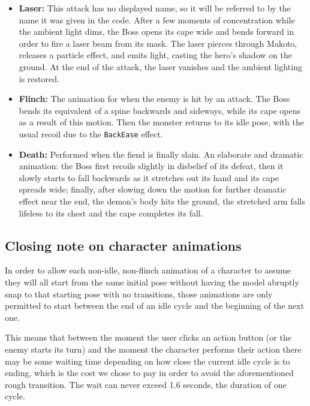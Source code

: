 \begin{itemize}
    \item \textbf{Laser:} This attack has no displayed name, so it will be referred to by the name it was given in the code. After a few moments of concentration while the ambient light dims, the Boss opens its cape wide and bends forward in order to fire a laser beam from its mask. The laser pierces through Makoto, releases a particle effect, and emits light, casting the hero's shadow on the ground. At the end of the attack, the laser vanishes and the ambient lighting is restored.
    
    \item \textbf{Flinch:} The animation for when the enemy is hit by an attack. The Boss bends its equivalent of a spine backwards and sideways, while its cape opens as a result of this motion. Then the monster returns to its idle pose, with the usual recoil due to the \texttt{BackEase} effect.
    
    \item \textbf{Death:} Performed when the fiend is finally slain. An elaborate and dramatic animation: the Boss first recoils slightly in disbelief of its defeat, then it slowly starts to fall backwards as it stretches out its hand and its cape spreads wide; finally, after slowing down the motion for further dramatic effect near the end, the demon's body hits the ground, the stretched arm falls lifeless to its chest and the cape completes its fall.
\end{itemize}


\subsection{Closing note on character animations}

In order to allow each non-idle, non-flinch animation of a character to assume they will all start from the same initial pose without having the model abruptly snap to that starting pose with no transitions, those animations are only permitted to start between the end of an idle cycle and the beginning of the next one.

This means that between the moment the user clicks an action button (or the enemy starts its turn) and the moment the character performs their action there may be some waiting time depending on how close the current idle cycle is to ending, which is the cost we chose to pay in order to avoid the aforementioned rough transition. The wait can never exceed 1.6 seconds, the duration of one cycle.



